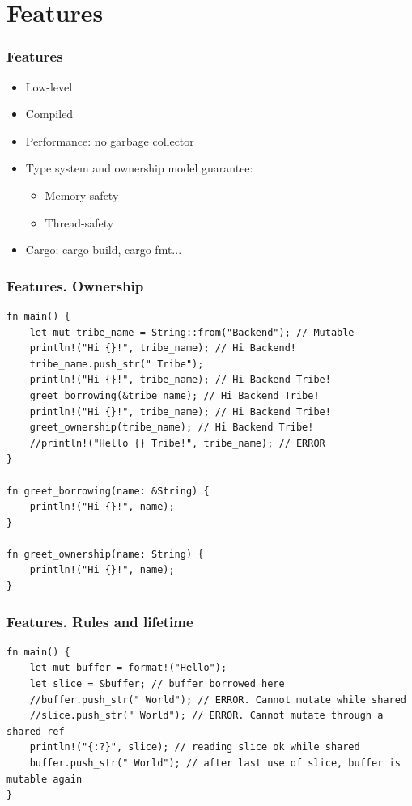 \documentclass{beamer}
\begin{document}
\section{Features}

\begin{frame}
\frametitle{Features}

\begin{itemize}
\item Low-level
\item Compiled
\item Performance: no garbage collector
\item Type system and ownership model guarantee:
  \begin{itemize}
  \item Memory-safety
  \item Thread-safety
  \end{itemize}
\item Cargo: cargo build, cargo fmt...
\end{itemize}

\end{frame}

\begin{frame}[fragile]
\frametitle{Features. Ownership}

\begin{lstlisting}
fn main() {
    let mut tribe_name = String::from("Backend"); // Mutable
    println!("Hi {}!", tribe_name); // Hi Backend!
    tribe_name.push_str(" Tribe");
    println!("Hi {}!", tribe_name); // Hi Backend Tribe!
    greet_borrowing(&tribe_name); // Hi Backend Tribe!
    println!("Hi {}!", tribe_name); // Hi Backend Tribe!
    greet_ownership(tribe_name); // Hi Backend Tribe!
    //println!("Hello {} Tribe!", tribe_name); // ERROR
}

fn greet_borrowing(name: &String) {
    println!("Hi {}!", name);
}

fn greet_ownership(name: String) {
    println!("Hi {}!", name);
}
\end{lstlisting}

\end{frame}

\begin{frame}[fragile]
\frametitle{Features. Rules and lifetime}

\begin{lstlisting}
fn main() {
    let mut buffer = format!("Hello");
    let slice = &buffer; // buffer borrowed here
    //buffer.push_str(" World"); // ERROR. Cannot mutate while shared
    //slice.push_str(" World"); // ERROR. Cannot mutate through a shared ref
    println!("{:?}", slice); // reading slice ok while shared
    buffer.push_str(" World"); // after last use of slice, buffer is mutable again
}
\end{lstlisting}

\end{frame}
\end{document}
